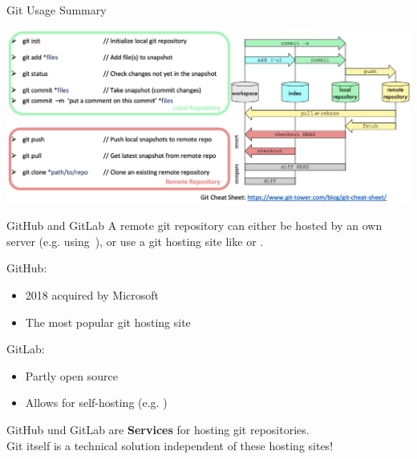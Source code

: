 \documentclass{setbeamer}
\begin{document}
\begin{frame}{Git Usage Summary}

\centering
\includegraphics[width=15cm]{resources/git_summary.png}
\end{frame}


\begin{frame}{GitHub and GitLab}
    A remote git repository can either be hosted by an own server (e.g. using~), or use a git hosting site like  or .

    \vspace{3mm}

    GitHub:
    \begin{itemize}
        \item 2018 acquired by Microsoft
        \item The most popular git hosting site
    \end{itemize}

    \vspace{3mm}

    GitLab:
    \begin{itemize}
        \item Partly open source
        \item Allows for self-hosting (e.g. )
    \end{itemize}

    \vspace{3mm}

    \begin{TUMBoxFill}[orange]{}{}
        GitHub und GitLab are \textbf{Services} for hosting git repositories.\\ Git itself is a technical solution independent of these hosting sites!
    \end{TUMBoxFill}
\end{frame}
\end{document}
